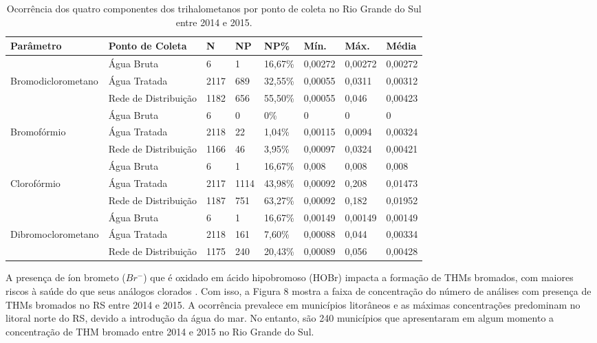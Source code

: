 \begin{table}[!htb]
\begin{flushleft}
\small
\caption{\small Ocorrência dos quatro componentes dos trihalometanos por ponto de coleta no Rio Grande do Sul entre 2014 e 2015.} \label{tab:com_esp}
\centering
\begin{tabular}{p{3cm}p{3.3cm}p{1cm}p{0.6cm}p{1.2cm}p{1.1cm}p{1.1cm}p{1.1cm}}
\toprule
\textbf{Parâmetro}  & \textbf{Ponto de Coleta}& \textbf{N} & \textbf{NP} & \textbf{NP\%} &  \textbf{Mín.}  & \textbf{Máx.} & \textbf{Média} 
 \\
\midrule
& Água Bruta & 6 & 1 & 16,67\%& 0,00272 & 0,00272 & 0,00272\\
Bromodiclorometano & Água Tratada & 2117 & 689 & 32,55\% & 0,00055 & 0,0311 & 0,00312\\
& Rede de Distribuição & 1182 & 656 & 55,50\% &0,00055 & 0,046&0,00423\\
\hline
& Água Bruta & 6 & 0 & 0\% & 0 & 0 & 0 \\ 
Bromofórmio & Água Tratada & 2118 & 22 & 1,04\% & 0,00115 & 0,0094 & 0,00324\\
& Rede de Distribuição & 1166 & 46 & 3,95\% & 0,00097 & 0,0324 & 0,00421\\\hline
& Água Bruta & 6 & 1 & 16,67\% & 0,008 & 0,008 & 0,008\\ 
Clorofórmio & Água Tratada & 2117 & 1114 & 43,98\% & 0,00092 & 0,208 &0,01473\\
& Rede de Distribuição & 1187 & 751 & 63,27\% & 0,00092& 0,182 & 0,01952\\\hline
& Água Bruta & 6 & 1 & 16,67\% & 0,00149 & 0,00149 & 0,00149\\ 
Dibromoclorometano &Água Tratada & 2118 & 161 & 7,60\% & 0,00088 & 0,044 &0,00334\\
& Rede de Distribuição & 1175 & 240 & 20,43\% & 0,00089& 0,056 & 0,00428\\
\bottomrule
\end{tabular}
\end{flushleft}
\end{table}


A presença de íon brometo ($Br^-$) que é oxidado em ácido hipobromoso (HOBr) impacta a formação de THMs bromados, com maiores riscos à saúde do que seus análogos clorados \cite{uyak2007investigation}. Com isso, a Figura 8 mostra a faixa de concentração do número de análises com presença de THMs bromados no RS entre 2014 e 2015. A ocorrência prevalece em municípios litorâneos e as máximas concentrações predominam no litoral norte do RS, devido a introdução da água do mar. No entanto, são 240 municípios que apresentaram em algum momento a concentração de THM bromado entre 2014 e 2015 no Rio Grande do Sul.


